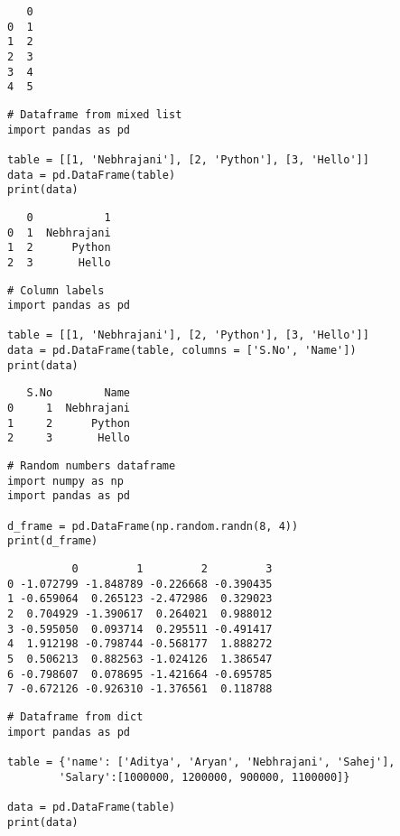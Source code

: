 \documentclass[11pt]{article}
\begin{document}
\begin{verbatim}
   0
0  1
1  2
2  3
3  4
4  5
\end{verbatim}


\begin{verbatim}
# Dataframe from mixed list
import pandas as pd

table = [[1, 'Nebhrajani'], [2, 'Python'], [3, 'Hello']]
data = pd.DataFrame(table)
print(data)
\end{verbatim}

\begin{verbatim}
   0           1
0  1  Nebhrajani
1  2      Python
2  3       Hello
\end{verbatim}


\begin{verbatim}
# Column labels
import pandas as pd

table = [[1, 'Nebhrajani'], [2, 'Python'], [3, 'Hello']]
data = pd.DataFrame(table, columns = ['S.No', 'Name'])
print(data)
\end{verbatim}

\begin{verbatim}
   S.No        Name
0     1  Nebhrajani
1     2      Python
2     3       Hello
\end{verbatim}


\begin{verbatim}
# Random numbers dataframe
import numpy as np
import pandas as pd

d_frame = pd.DataFrame(np.random.randn(8, 4))
print(d_frame)
\end{verbatim}

\begin{verbatim}
          0         1         2         3
0 -1.072799 -1.848789 -0.226668 -0.390435
1 -0.659064  0.265123 -2.472986  0.329023
2  0.704929 -1.390617  0.264021  0.988012
3 -0.595050  0.093714  0.295511 -0.491417
4  1.912198 -0.798744 -0.568177  1.888272
5  0.506213  0.882563 -1.024126  1.386547
6 -0.798607  0.078695 -1.421664 -0.695785
7 -0.672126 -0.926310 -1.376561  0.118788
\end{verbatim}


\begin{verbatim}
# Dataframe from dict
import pandas as pd

table = {'name': ['Aditya', 'Aryan', 'Nebhrajani', 'Sahej'],
        'Salary':[1000000, 1200000, 900000, 1100000]}

data = pd.DataFrame(table)
print(data)
\end{verbatim}
\end{document}

